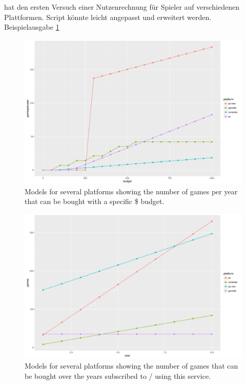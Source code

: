  hat den ersten Versuch einer Nutzenrechnung für Spieler auf verschiedenen Plattformen. Script könnte leicht angepasst und erweitert werden. Beispielausgabe \ref{fig:gamesperyear-over-budget}



\begin{figure}[!t]
	\centering
	\includegraphics[width=1.0\columnwidth]{images/gamesperyear-over-budget.pdf}
	\caption{Models for several platforms showing the number of games per year that can be bought with a specific \$ budget.}
\label{fig:gamesperyear-over-budget}
\end{figure}

\begin{figure}[!t]
	\centering
	\includegraphics[width=1.0\columnwidth]{images/games-over-year.pdf}
	\caption{Models for several platforms showing the number of games that can be bought over the years subscribed to / using this service.}
\label{fig:games-over-years}
\end{figure}



